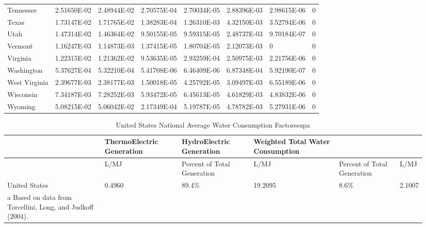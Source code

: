 \begin{longtable}[c]{p{0.75in}p{0.75in}p{0.75in}p{0.75in}p{0.75in}p{0.75in}p{0.75in}p{0.75in}}
Tennessee & 2.51650E-02 & 2.48944E-02 & 2.70575E-04 & 2.70034E-05 & 2.88396E-03 & 2.98615E-06 & 0 \tabularnewline
Texas & 1.73147E-02 & 1.71765E-02 & 1.38283E-04 & 1.26310E-03 & 4.32150E-03 & 3.52794E-06 & 0 \tabularnewline
Utah & 1.47314E-02 & 1.46364E-02 & 9.50155E-05 & 9.59315E-05 & 2.48737E-03 & 9.70184E-07 & 0 \tabularnewline
Vermont & 1.16247E-03 & 1.14873E-03 & 1.37415E-05 & 1.80704E-05 & 2.12073E-03 & 0 & 0 \tabularnewline
Virginia & 1.22315E-02 & 1.21362E-02 & 9.53635E-05 & 2.93259E-04 & 2.50975E-03 & 2.21756E-06 & 0 \tabularnewline
Washington & 5.37627E-04 & 5.32210E-04 & 5.41708E-06 & 6.46409E-06 & 6.87348E-04 & 5.92190E-07 & 0 \tabularnewline
West Virginia & 2.39677E-03 & 2.38177E-03 & 1.50018E-05 & 4.25792E-05 & 3.09497E-03 & 6.55189E-06 & 0 \tabularnewline
Wisconsin & 7.34187E-03 & 7.28252E-03 & 5.93472E-05 & 6.45613E-05 & 4.61829E-03 & 4.83832E-06 & 0 \tabularnewline
Wyoming & 5.08215E-02 & 5.06042E-02 & 2.17349E-04 & 5.19787E-05 & 4.78782E-03 & 5.27931E-06 & 0 \tabularnewline
\bottomrule
\end{longtable}

\begin{longtable}[c]{p{1.0in}p{1.0in}p{1.0in}p{1.0in}p{1.0in}p{1.0in}}
\caption{  United States National Average Water Consumption Factorssup{}a \protect \label{table:united-states-national-average-water}}\\
\toprule 
 & ThermoElectric Generation & HydroElectric Generation & Weighted Total Water Consumption \tabularnewline \midrule
\endhead
 & L/MJ & Percent of Total Generation & L/MJ & Percent of Total Generation & L/MJ \tabularnewline
United States & 0.4960 & 89.4\% & 19.2095 & 8.6\% & 2.1007 \tabularnewline
a Based on data from Torcellini, Long, and Judkoff (2004). \tabularnewline
\bottomrule
\end{longtable}


